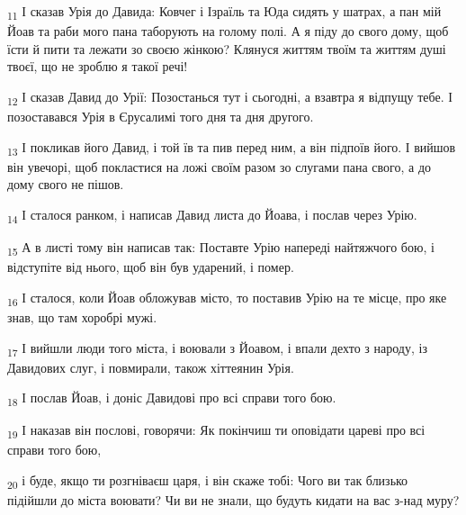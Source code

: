 \begin{tcolorbox}
\textsubscript{11} І сказав Урія до Давида: Ковчег і Ізраїль та Юда сидять у шатрах, а пан мій Йоав та раби мого пана таборують на голому полі. А я піду до свого дому, щоб їсти й пити та лежати зо своєю жінкою? Клянуся життям твоїм та життям душі твоєї, що не зроблю я такої речі!
\end{tcolorbox}
\begin{tcolorbox}
\textsubscript{12} І сказав Давид до Урії: Позостанься тут і сьогодні, а взавтра я відпущу тебе. І позоставався Урія в Єрусалимі того дня та дня другого.
\end{tcolorbox}
\begin{tcolorbox}
\textsubscript{13} І покликав його Давид, і той їв та пив перед ним, а він підпоїв його. І вийшов він увечорі, щоб покластися на ложі своїм разом зо слугами пана свого, а до дому свого не пішов.
\end{tcolorbox}
\begin{tcolorbox}
\textsubscript{14} І сталося ранком, і написав Давид листа до Йоава, і послав через Урію.
\end{tcolorbox}
\begin{tcolorbox}
\textsubscript{15} А в листі тому він написав так: Поставте Урію напереді найтяжчого бою, і відступіте від нього, щоб він був ударений, і помер.
\end{tcolorbox}
\begin{tcolorbox}
\textsubscript{16} І сталося, коли Йоав обложував місто, то поставив Урію на те місце, про яке знав, що там хоробрі мужі.
\end{tcolorbox}
\begin{tcolorbox}
\textsubscript{17} І вийшли люди того міста, і воювали з Йоавом, і впали дехто з народу, із Давидових слуг, і повмирали, також хіттеянин Урія.
\end{tcolorbox}
\begin{tcolorbox}
\textsubscript{18} І послав Йоав, і доніс Давидові про всі справи того бою.
\end{tcolorbox}
\begin{tcolorbox}
\textsubscript{19} І наказав він послові, говорячи: Як покінчиш ти оповідати цареві про всі справи того бою,
\end{tcolorbox}
\begin{tcolorbox}
\textsubscript{20} і буде, якщо ти розгніваєш царя, і він скаже тобі: Чого ви так близько підійшли до міста воювати? Чи ви не знали, що будуть кидати на вас з-над муру?
\end{tcolorbox}
